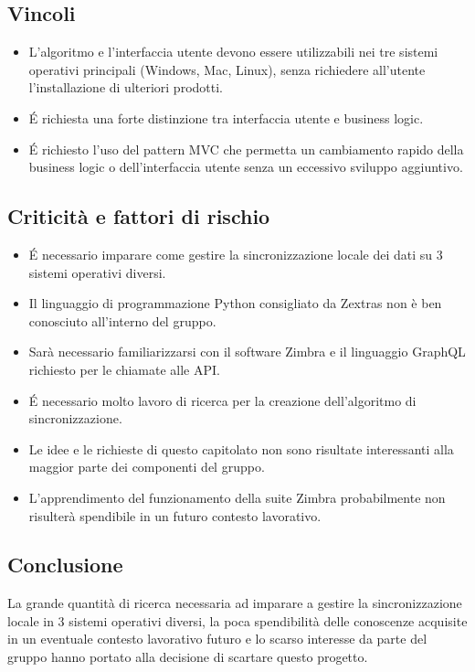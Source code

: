 \subsection{Vincoli}
\begin{itemize}
\item L'algoritmo e l'interfaccia utente devono essere utilizzabili nei tre sistemi operativi principali (Windows, Mac, Linux), senza richiedere all'utente l'installazione di ulteriori prodotti.
\item É richiesta una forte distinzione tra interfaccia utente e business logic.
\item É richiesto l'uso del pattern MVC che permetta un cambiamento rapido della business logic o dell'interfaccia utente senza un eccessivo sviluppo aggiuntivo.
\end{itemize}

\subsection{Criticità e fattori di rischio}
\begin{itemize}
\item É necessario imparare come gestire la sincronizzazione locale dei dati su 3 sistemi operativi diversi.
\item Il linguaggio di programmazione Python consigliato da Zextras non è ben conosciuto all'interno del gruppo.
\item Sarà necessario familiarizzarsi con il software Zimbra e il linguaggio GraphQL richiesto per le chiamate alle API.
\item É necessario molto lavoro di ricerca per la creazione dell'algoritmo di sincronizzazione.
\item Le idee e le richieste di questo capitolato non sono risultate interessanti alla maggior parte dei componenti del gruppo.
\item L'apprendimento del funzionamento della suite Zimbra probabilmente non risulterà spendibile in un futuro contesto lavorativo.
\end{itemize}

\subsection{Conclusione}
La grande quantità di ricerca necessaria ad imparare a gestire la sincronizzazione locale in 3 sistemi operativi diversi, la poca spendibilità delle conoscenze acquisite in un eventuale contesto lavorativo futuro e lo scarso interesse da parte del gruppo hanno portato alla decisione di scartare questo progetto.
